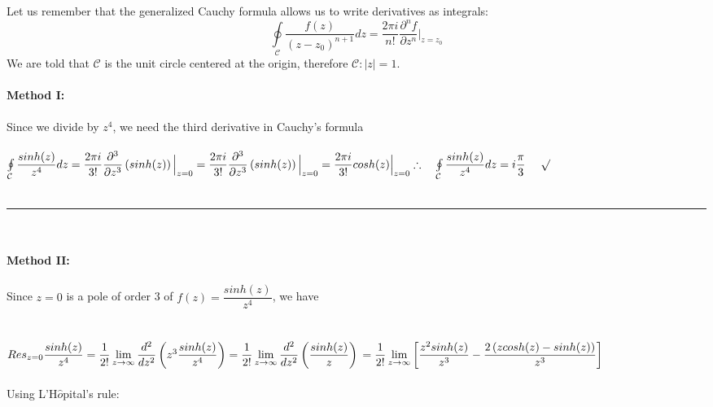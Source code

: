 \documentclass[fleqn]{article}
\begin{document}
\begin{enumerate}
      \textcolor{hwColor}{
        Let us remember that the generalized Cauchy formula allows us to write derivatives as integrals:
        $$\oint\limits_{\mathcal C} \dfrac{f(z)}{(z-z_0)^{n+1}}dz=\dfrac{2 \pi i}{n!} \dfrac{\partial^n f}{\partial z^n} \Big|_{z=z_0}$$
        We are told that $\mathcal{C}$ is the unit circle centered at the origin, therefore $\mathcal{C}:|z|=1$. 
        \\
        \\
        \textbf{Method I:} \\
        \\
        Since we divide by $z^4$, we need the third derivative in Cauchy's formula \\ \\
        $
          \oint\limits_{\mathcal C} \dfrac{sinh(z)}{z^4} dz=\dfrac{2 \pi i}{3!} \dfrac{\partial^3}{\partial z^3} \left(sinh(z)\right) \Big|_{z=0}
          =\dfrac{2 \pi i}{3!} \dfrac{\partial^3}{\partial z^3} \left(sinh(z)\right) \Big|_{z=0}
          =\dfrac{2 \pi i}{3!} cosh(z) \Big|_{z=0}
          \\
          \\
          \\
          \therefore ~~~ \oint\limits_{\mathcal C} \dfrac{sinh(z)}{z^4} dz=i\dfrac{\pi}{3} ~~~~ \surd
        $ 
        \\
        \\
        \rule{15cm}{1pt}
        \\
        \\
        \textbf{Method II:} \\
        \\
        Since $z=0$ is a pole of order 3 of $f(z)=\dfrac{sinh(z)}{z^4}$, we have \\
        \\
        \\
        $
          Res_{z=0} \dfrac{sinh(z)}{z^4}=\dfrac{1}{2!} \lim\limits_{z\to\infty} \dfrac{d^2}{dz^2} \left(z^3 \dfrac{sinh(z)}{z^4}\right)
          =\dfrac{1}{2!} \lim\limits_{z\to\infty} \dfrac{d^2}{dz^2} \left(\dfrac{sinh(z)}{z}\right) \\
          \\
          \\
          =\dfrac{1}{2!} \lim\limits_{z\to\infty} \left[\dfrac{z^2 sinh(z)}{z^3}-\dfrac{2 \left(z cosh(z)-sinh(z)\right)}{z^3}\right]
        $
        \\
        \\
        Using L'H$\hat{o}$pital's rule: \\
}
\end{enumerate}
\end{document}
